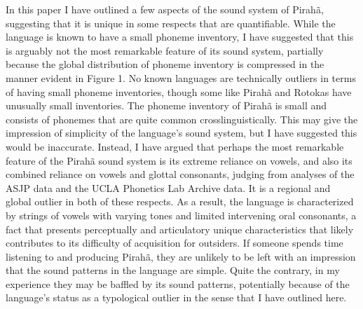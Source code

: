 \documentclass[output=paper,colorlinks,citecolor=brown
]{langscibook}
\begin{document}
    In this paper I have outlined a few aspects of the sound system of Pirahã, suggesting that it is unique in some respects that are quantifiable. While the language is known to have a small phoneme inventory, I have suggested that this is arguably not the most remarkable feature of its sound system, partially because the global distribution of phoneme inventory is compressed in the manner evident in Figure 1. No known languages are technically outliers in terms of having small phoneme inventories, though some like Pirahã and Rotokas have unusually small inventories.  The phoneme inventory of Pirahã is small and consists of phonemes that are quite common crosslinguistically. This may give the impression of simplicity of the language’s sound system, but I have suggested this would be inaccurate. Instead, I have argued that perhaps the most remarkable feature of the Pirahã sound system is its extreme reliance on vowels, and also its combined reliance on vowels and glottal consonants, judging from analyses of the ASJP data and the UCLA Phonetics Lab Archive data. It is a regional and global outlier in both of these respects. As a result, the language is characterized by strings of vowels with varying tones and limited intervening oral consonants, a fact that presents perceptually and articulatory unique characteristics that likely contributes to its difficulty of acquisition for outsiders. If someone spends time listening to and producing Pirahã, they are unlikely to be left with an impression that the sound patterns in the language are simple. Quite the contrary, in my experience they may be baffled by its sound patterns, potentially because of the language’s status as a typological outlier in the sense that I have outlined here.

\printbibliography[heading=subbibliography,notkeyword=this]
\end{document}
